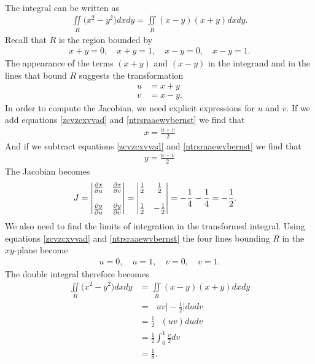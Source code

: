 \item %
 \\
The integral can be written as
\begin{align*}
  \iint\limits_R \big(x^2 - y^2\big) dxdy =  \iint\limits_R (x - y)(x+y) dxdy.
\end{align*}
Recall that $R$ is the region bounded by
\begin{align*}
  x+y = 0, \quad x+y = 1, \quad x-y=0, \quad x-y=1.
\end{align*}
The appearance of the terms $(x+y)$ and $(x - y)$ in the integrand and in the lines that bound $R$ suggests the transformation 
\begin{align}
  u & = x+y  \label{zcvzcxvvad}\\
  v &= x - y \label{ntrsraaewvbernst}.
\end{align}
In order to compute the Jacobian, we need explicit expressions for $u$ and $v$. If we add  equations \ref{zcvzcxvvad} and \ref{ntrsraaewvbernst} we find that 
\begin{align*}   x = \frac{u+v}{2}   \end{align*}
And if we subtract equations \ref{zcvzcxvvad} and \ref{ntrsraaewvbernst} we find that
\begin{align*}   y = \frac{u-v}{2}   \end{align*}
The Jacobian becomes
\begin{align*}   J &=  
  \begin{vmatrix}
   \frac{\partial x}{\partial u} &  \frac{\partial x}{\partial v} \\ \\
   \frac{\partial y}{\partial u} & \frac{\partial y}{\partial v} \\
  \end{vmatrix}
  =     \begin{vmatrix}
 \frac{1}{2} &  \frac{1}{2} \\ \\
   \frac{1}{2} & -\frac{1}{2} \\
  \end{vmatrix}
  = - \frac{1}{4}- \frac{1}{4} = - \frac{1}{2}.
 \end{align*}
We also need to find the limits of  integration in the transformed integral. Using equations \ref{zcvzcxvvad} and \ref{ntrsraaewvbernst} the four lines bounding $R$ in the $xy$-plane become 
\begin{align*}
  u = 0, \quad u = 1, \quad v=0, \quad v=1.
\end{align*}
The double integral therefore becomes
\begin{align*}
  \iint\limits_R \big(x^2 - y^2\big) dxdy 
  &=  \iint\limits_R (x - y)(x+y) dxdy \\
  &=    \mathop{\int_0^1 \! \int_0^1} uv \Bigg|-\frac{1}{2} \Bigg| dudv \\
  &=     \frac{1}{2}\mathop{\int_0^1 \! \int_0^1} (uv) dudv \\
  &=     \frac{1}{2}\int_0^1 \frac{v}{2} dv \\
  &=   \frac{1}{8}.
\end{align*}

